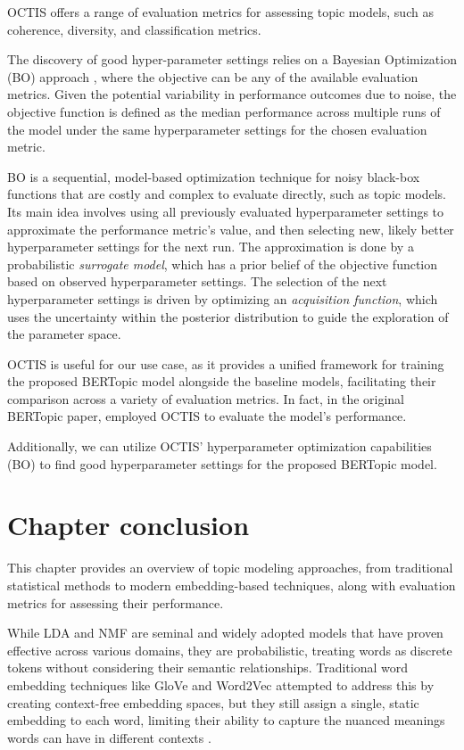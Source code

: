OCTIS offers a range of evaluation metrics for assessing topic models, such as coherence, diversity, and classification metrics.

The discovery of good hyper-parameter settings relies on a Bayesian Optimization (BO) approach \cite{archetti_bayesian_2019, galuzzi_hyperparameter_2020, snoek_practical_2012}, where the objective can be any of the available evaluation metrics. Given the potential variability in performance outcomes due to noise, the objective function is defined as the median performance across multiple runs of the model under the same hyperparameter settings for the chosen evaluation metric.

BO is a sequential, model-based optimization technique for noisy black-box functions that are costly and complex to evaluate directly, such as topic models. Its main idea involves using all previously evaluated hyperparameter settings to approximate the performance metric's value, and then selecting new, likely better hyperparameter settings for the next run. The approximation is done by a probabilistic \textit{surrogate model}, which has a prior belief of the objective function based on observed hyperparameter settings. The selection of the next hyperparameter settings is driven by optimizing an \textit{acquisition function}, which uses the uncertainty within the posterior distribution to guide the exploration of the parameter space.

OCTIS is useful for our use case, as it provides a unified framework for training the proposed BERTopic model alongside the baseline models, facilitating their comparison across a variety of evaluation metrics. In fact, in the original BERTopic paper, \citet{grootendorst_bertopic_2022} employed OCTIS to evaluate the model's performance.

Additionally, we can utilize OCTIS' hyperparameter optimization capabilities (BO) to find good hyperparameter settings for the proposed BERTopic model.

\section{Chapter conclusion}
\label{sec:chapter_conclusion_preliminaries}
This chapter provides an overview of topic modeling approaches, from traditional statistical methods to modern embedding-based techniques, along with evaluation metrics for assessing their performance.

While LDA \cite{blei_latent_2001} and NMF \cite{shahnaz_document_2006, kasiviswanathan_emerging_2011, yan_learning_2013} are seminal and widely adopted models that have proven effective across various domains, they are probabilistic, treating words as discrete tokens without considering their semantic relationships. Traditional word embedding techniques like GloVe \cite{pennington_glove_2014} and Word2Vec \cite{mikolov_efficient_2013} attempted to address this by creating context-free embedding spaces, but they still assign a single, static embedding to each word, limiting their ability to capture the nuanced meanings words can have in different contexts \cite{thompson_topic_2020}.

